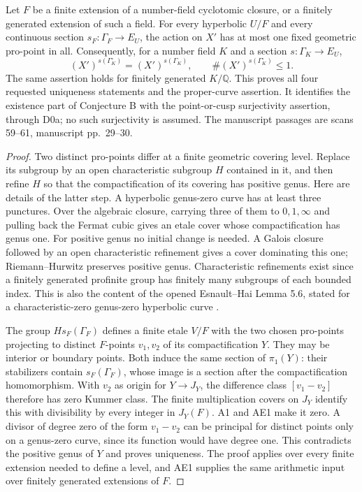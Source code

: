 \documentclass[11pt,a4paper]{article}
\begin{document}
Let $F$ be a finite extension of a number-field cyclotomic closure, or a finitely generated extension of such a field. For every hyperbolic $U/F$ and every continuous section $s_F:\Gamma_F\to E_U$, the action on $X'$ has at most one fixed geometric pro-point in all. Consequently, for a number field $K$ and a section $s:\Gamma_K\to E_U$,
\[
 (X')^{s(\Gamma_K^\circ)}=(X')^{s(\Gamma_K)},
 \qquad \#(X')^{s(\Gamma_K^\circ)}\le1.
 \tag{D.1}
\]
The same assertion holds for finitely generated $K/\mathbb Q$. This proves all four requested uniqueness statements and the proper-curve assertion. It identifies the existence part of Conjecture B with the point-or-cusp surjectivity assertion, through D0a; no such surjectivity is assumed. The manuscript passages are scans 59--61, manuscript pp.~29--30.

\begin{proof}
Two distinct pro-points differ at a finite geometric covering level. Replace its subgroup by an open characteristic subgroup $H$ contained in it, and then refine $H$ so that the compactification of its covering has positive genus. Here are details of the latter step. A hyperbolic genus-zero curve has at least three punctures. Over the algebraic closure, carrying three of them to $0,1,\infty$ and pulling back the Fermat cubic gives an etale cover whose compactification has genus one. For positive genus no initial change is needed. A Galois closure followed by an open characteristic refinement gives a cover dominating this one; Riemann--Hurwitz preserves positive genus. Characteristic refinements exist since a finitely generated profinite group has finitely many subgroups of each bounded index. This is also the content of the opened Esnault--Hai Lemma 5.6, stated for a characteristic-zero genus-zero hyperbolic curve \cite{EsnaultHai2008}.

The group $H s_F(\Gamma_F)$ defines a finite etale $V/F$ with the two chosen pro-points projecting to distinct $F$-points $v_1,v_2$ of its compactification $Y$. They may be interior or boundary points. Both induce the same section of $\pi_1(Y)$: their stabilizers contain $s_F(\Gamma_F)$, whose image is a section after the compactification homomorphism. With $v_2$ as origin for $Y\to J_Y$, the difference class $[v_1-v_2]$ therefore has zero Kummer class. The finite multiplication covers on $J_Y$ identify this with divisibility by every integer in $J_Y(F)$. A1 and AE1 make it zero. A divisor of degree zero of the form $v_1-v_2$ can be principal for distinct points only on a genus-zero curve, since its function would have degree one. This contradicts the positive genus of $Y$ and proves uniqueness. The proof applies over every finite extension needed to define a level, and AE1 supplies the same arithmetic input over finitely generated extensions of $F$.


\end{proof}
\end{document}
